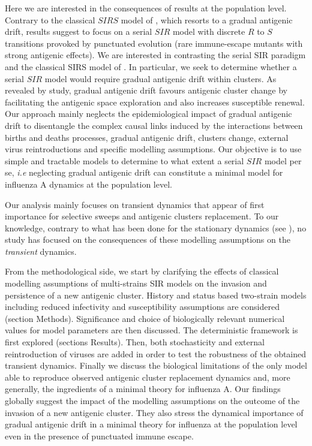 Here we are interested in the consequences of \citet{Koelle2006}
results at the population level. Contrary to the classical $SIRS$
model of \citet{Pease1987}, which resorts to a gradual antigenic
drift, \citet{Koelle2006} results suggest to focus on a serial $SIR$
model with discrete $R$ to $S$ transitions provoked by punctuated
evolution (rare immune-escape mutants with strong antigenic effects).
We are interested in contrasting the serial SIR paradigm and the
classical SIRS model of \citet{Pease1987}. In particular, we seek to
determine whether a serial $SIR$ model would require gradual antigenic
drift within clusters. As revealed by \citet{Koelle2006} study,
gradual antigenic drift favours antigenic cluster change by
facilitating the antigenic space exploration and also increases
susceptible renewal. Our approach mainly neglects the epidemiological
impact of gradual antigenic drift to disentangle the complex causal
links induced by the interactions between births and deaths processes,
gradual antigenic drift, clusters change, external virus
reintroductions and specific modelling assumptions. Our objective is
to use simple and tractable models to determine to what extent a
serial $SIR$ model per se, \textit{i.e} neglecting gradual antigenic
drift can constitute a minimal model for influenza A dynamics at the
population level.

Our analysis mainly focuses on transient dynamics that appear of first
importance for selective sweeps and antigenic clusters replacement. To
our knowledge, contrary to what has been done for the stationary
dynamics (see \citet{Dawes2002}), no study has focused on the
consequences of these modelling assumptions on the \emph{transient}
dynamics.

From the methodological side, we start by clarifying the effects of
classical modelling assumptions of multi-strains SIR models on the
invasion and persistence of a new antigenic cluster. History and
status based two-strain models including reduced infectivity and
susceptibility assumptions are considered (section Methods).
Significance and choice of biologically relevant numerical values for
model parameters are then discussed. The deterministic framework is
first explored (sections Results). Then, both stochasticity and
external reintroduction of viruses are added in order to test the
robustness of the obtained transient dynamics. Finally we discuss the
biological limitations of the only model able to reproduce observed
antigenic cluster replacement dynamics and, more generally, the
ingredients of a minimal theory for influenza A.
%
Our findings globally suggest the impact of the modelling assumptions
on the outcome of the invasion of a new antigenic cluster. They also
stress the dynamical importance of gradual antigenic drift in a
minimal theory for influenza at the population level even in the
presence of punctuated immune escape.


